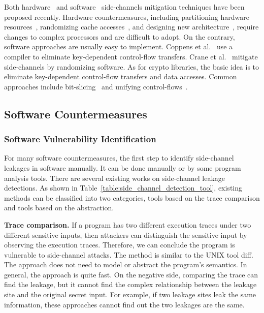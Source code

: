 Both hardware~\cite{Page2005PartitionedCA,
    Wang:2007:NCD:1250662.1250723,Zhang:2015:HDL:2775054.2694372,Li:2014:SLH:2541940.2541947,
    236344, 236334} and software~\cite{shih2017t,Coppens:2009:PMT:1607723.1608124,
    brickell2006software,crane2015thwarting, 197207} side-channels mitigation techniques have
been proposed recently. Hardware countermeasures, including partitioning hardware resources~\cite{Page2005PartitionedCA}, randomizing cache
accesses~\cite{Wang:2007:NCD:1250662.1250723, 236344}, and designing new
architecture~\cite{tiwari2011crafting}, require changes to complex processors and are difficult to adopt. On the contrary, software approaches are
usually easy to implement. Coppens et
al.~\cite{Coppens:2009:PMT:1607723.1608124} use a compiler
to eliminate key-dependent control-flow transfers. Crane et
al.~\cite{crane2015thwarting} mitigate side-channels by randomizing software.
As for crypto libraries, the basic idea is to eliminate key-dependent
control-flow transfers and data accesses. Common approaches include
bit-slicing~\cite{konighofer2008fast,rebeiro2006bitslice} and unifying
control-flows~\cite{Coppens:2009:PMT:1607723.1608124}.

\subsection{Software Countermeasures}
\subsubsection*{Software Vulnerability Identification}
For many software countermeasures, the first step to identify side-channel leakages in software manually. It can be done manually or by some program analysis tools.
There are several existing works on side-channel leakage detections. As shown in Table~\ref{table:side_channel_detection_tool}, existing methods can be classified into two categories, tools based on the trace comparison and tools based on the abstraction.

\textbf{Trace comparison.} If a program has two different execution traces under two different sensitive inputs, then attackers can distinguish the sensitive input by observing the execution traces. Therefore, we can conclude the program is vulnerable to side-channel attacks. The method is similar to the UNIX tool \textsf{diff}.  The approach does not need to model or abstract the program's semantics. In general, the approach is quite fast. On the negative side, comparing the trace can find the leakage, but it cannot find the complex relationship between the leakage site and the original secret input. For example, if two leakage sites leak the same information, these approaches cannot find out the two leakages are the same.

